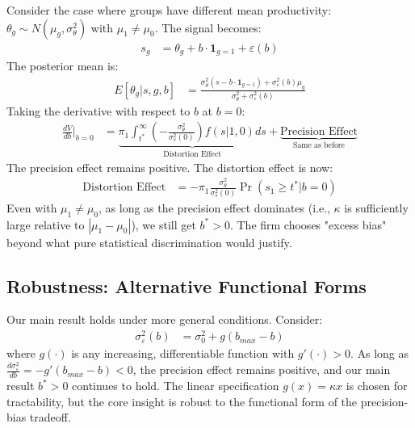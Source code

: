 Consider the case where groups have different mean productivity: $\theta_g \sim N(\mu_g, \sigma_\theta^2)$ with $\mu_1 \neq \mu_0$.
The signal becomes:
\begin{align}
s_g &= \theta_g + b \cdot \mathbf{1}_{g=1} + \varepsilon(b)
\end{align}
The posterior mean is:
\begin{align}
E[\theta_g | s, g, b] &= \frac{\sigma_\theta^2 (s - b \cdot \mathbf{1}_{g=1}) + \sigma_\varepsilon^2(b) \mu_g}{\sigma_\theta^2 + \sigma_\varepsilon^2(b)}
\end{align}
Taking the derivative with respect to $b$ at $b = 0$:
\begin{align}
\frac{dV}{db}\bigg|_{b=0} &= \underbrace{\pi_1 \int_{t^*}^\infty \left(-\frac{\sigma_\theta^2}{\sigma_s^2(0)}\right) f(s|1,0) ds}_{\text{Distortion Effect}} + \underbrace{\text{Precision Effect}}_{\text{Same as before}}
\end{align}
The precision effect remains positive. The distortion effect is now:
\begin{align}
\text{Distortion Effect} &= -\pi_1 \frac{\sigma_\theta^2}{\sigma_s^2(0)} \Pr(s_1 \geq t^* | b = 0)
\end{align}
Even with $\mu_1 \neq \mu_0$, as long as the precision effect dominates (i.e., $\kappa$ is sufficiently large relative to $|\mu_1 - \mu_0|$), we still get $b^* > 0$. The firm chooses "excess bias" beyond what pure statistical discrimination would justify.

\subsection{Robustness: Alternative Functional Forms}

Our main result holds under more general conditions. Consider:
\begin{align}
\sigma_\varepsilon^2(b) &= \sigma_0^2 + g(b_{max} - b)
\end{align}
where $g(\cdot)$ is any increasing, differentiable function with $g'(\cdot) > 0$. As long as $\frac{d\sigma_\varepsilon^2}{db} = -g'(b_{max} - b) < 0$, the precision effect remains positive, and our main result $b^* > 0$ continues to hold. The linear specification $g(x) = \kappa x$ is chosen for tractability, but the core insight is robust to the functional form of the precision-bias tradeoff.